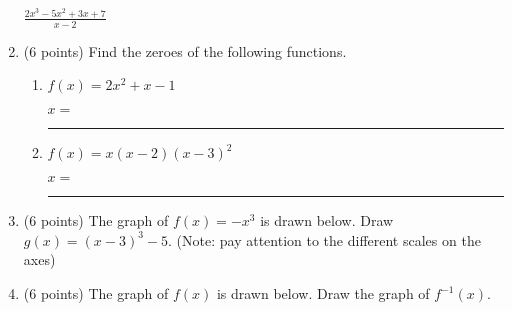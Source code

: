 \documentclass[11pt]{article}
\begin{document}
\begin{enumerate}
\vspace{10pt}
$\displaystyle{\frac{2x^3 - 5x^2 + 3x + 7}{x-2}}$
\vspace{60pt}

\item (6 points) Find the zeroes of the following functions. 
\begin{enumerate}[itemsep=10pt]
    \item $f(x) = 2x^2 + x - 1$
    \vspace{60pt}
    \begin{flushright}
    $x=$ \rule{4cm}{0.4pt}
    \end{flushright}

    \item $f(x) = x(x-2)(x-3)^2$
    \vspace{60pt}
    \begin{flushright}
    $x=$ \rule{4cm}{0.4pt}
    \end{flushright}
\end{enumerate}


\newpage

\item (6 points) The graph of $f(x)=-x^3$ is drawn below. Draw $g(x)=(x-3)^3-5$. (Note: pay attention to the different scales on the axes)
\vspace{4pt}
\begin{center}
\end{center}

\item (6 points) The graph of $f(x)$ is drawn below. Draw the graph of $f^{-1}(x)$.
\vspace{10pt}
\begin{center}
\end{center}


\end{enumerate}
\end{document}
